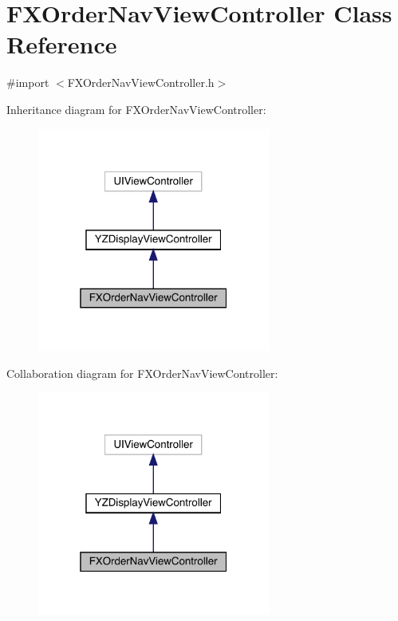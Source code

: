 \hypertarget{interface_f_x_order_nav_view_controller}{}\section{F\+X\+Order\+Nav\+View\+Controller Class Reference}
\label{interface_f_x_order_nav_view_controller}


{\ttfamily \#import $<$F\+X\+Order\+Nav\+View\+Controller.\+h$>$}



Inheritance diagram for F\+X\+Order\+Nav\+View\+Controller\+:\nopagebreak
\begin{figure}[H]
\begin{center}
\leavevmode
\includegraphics[width=217pt]{interface_f_x_order_nav_view_controller__inherit__graph}
\end{center}
\end{figure}


Collaboration diagram for F\+X\+Order\+Nav\+View\+Controller\+:\nopagebreak
\begin{figure}[H]
\begin{center}
\leavevmode
\includegraphics[width=217pt]{interface_f_x_order_nav_view_controller__coll__graph}
\end{center}
\end{figure}
